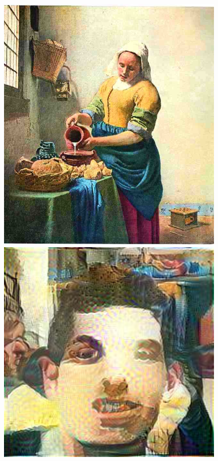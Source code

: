 \documentclass{article}
\begin{document}
\begin{figure}[!htb]
\centering
\begin{minipage}{0.25\textwidth}
\centering
\includegraphics[width=0.98\textwidth]{../Images/laitiere.jpg}
\end{minipage}%
\begin{minipage}{0.25\textwidth}
\centering
\includegraphics[width=0.98\textwidth]{../Images/transfer/tdf_laitiere.jpg}

\end{minipage}
\end{figure}
\end{document}
